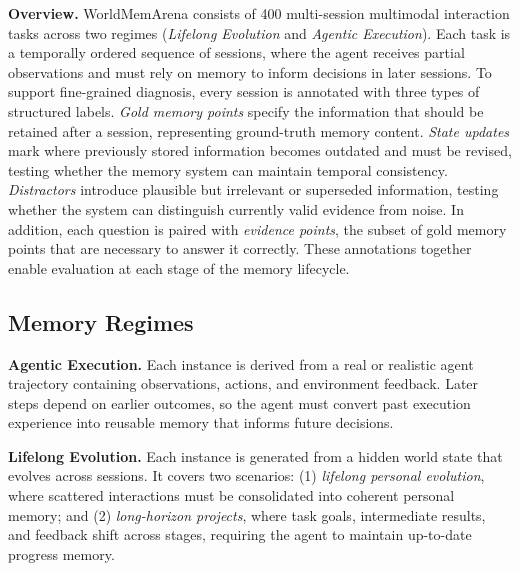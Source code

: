 \documentclass{article}
\begin{document}
\textbf{Overview.} WorldMemArena consists of 400 multi-session multimodal interaction tasks across two regimes (\textit{Lifelong Evolution} and \textit{Agentic Execution}). Each task is a temporally ordered sequence of sessions, where the agent receives partial observations and must rely on memory to inform decisions in later sessions. To support fine-grained diagnosis, every session is annotated with three types of structured labels. \textit{Gold memory points} specify the information that should be retained after a session, representing ground-truth memory content. \textit{State updates} mark where previously stored information becomes outdated and must be revised, testing whether the memory system can maintain temporal consistency. \textit{Distractors} introduce plausible but irrelevant or superseded information, testing whether the system can distinguish currently valid evidence from noise. In addition, each question is paired with \textit{evidence points}, the subset of gold memory points that are necessary to answer it correctly. These annotations together enable evaluation at each stage of the memory lifecycle.


\subsection{Memory Regimes}
\label{sec:regimes}

\textbf{Agentic Execution.} Each instance is derived from a real or realistic agent trajectory containing observations, actions, and environment feedback. Later steps depend on earlier outcomes, so the agent must convert past execution experience into reusable memory that informs future decisions.

\textbf{Lifelong Evolution.} Each instance is generated from a hidden world state that evolves across sessions. It covers two scenarios: (1) \textit{lifelong personal evolution}, where scattered interactions must be consolidated into coherent personal memory; and (2) \textit{long-horizon projects}, where task goals, intermediate results, and feedback shift across stages, requiring the agent to maintain up-to-date progress memory.
\end{document}
